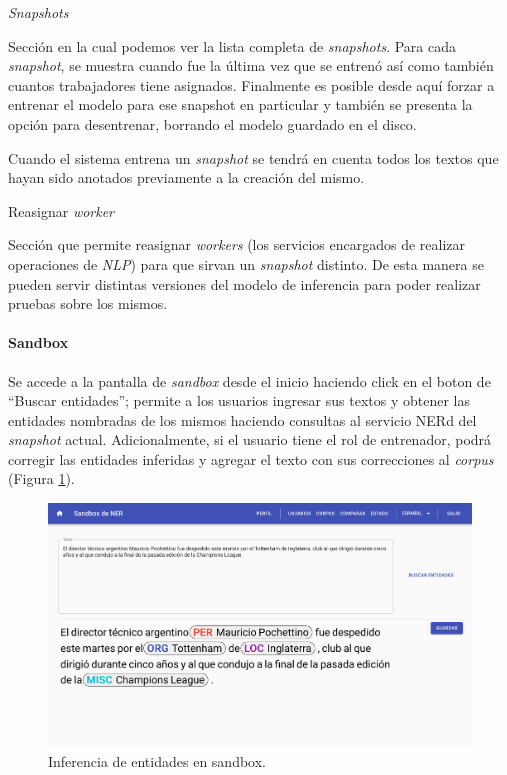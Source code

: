 \documentclass[12pt,a4paper,]{scrartcl}
\let\oldparagraph\paragraph
\renewcommand{\paragraph}[1]{\oldparagraph{#1}\mbox{}}
\begin{document}
\emph{Snapshots}

Sección en la cual podemos ver la lista completa de \emph{snapshots}.
Para cada \emph{snapshot}, se muestra cuando fue la última vez que se entrenó así como también cuantos trabajadores tiene asignados. Finalmente es posible desde aquí forzar a entrenar el modelo para ese snapshot en particular y también se presenta la opción para desentrenar, borrando el modelo guardado en el disco.

Cuando el sistema entrena un \emph{snapshot} se tendrá en cuenta todos los textos que hayan sido anotados previamente a la creación del mismo.

Reasignar \emph{worker}

Sección que permite reasignar \emph{workers} (los servicios encargados de realizar operaciones de \emph{NLP}) para que sirvan un \emph{snapshot} distinto. De esta manera se pueden servir distintas versiones del modelo de inferencia para poder realizar pruebas sobre los mismos.

\hypertarget{sandbox}{%
\paragraph{Sandbox}\label{sandbox}}

Se accede a la pantalla de \emph{sandbox} desde el inicio haciendo click en el boton de \enquote{Buscar entidades}; permite a los usuarios ingresar sus textos y obtener las entidades nombradas de los mismos haciendo consultas al servicio NERd del \emph{snapshot} actual.
Adicionalmente, si el usuario tiene el rol de entrenador, podrá corregir las entidades inferidas y agregar el texto con sus correcciones al \emph{corpus} (Figura \ref{fig:logic-sandbox}).

\begin{figure}[H]

{\centering \includegraphics{assets/logic/sandbox.pdf} 

}

\caption{Inferencia de entidades en sandbox.}\label{fig:logic-sandbox}
\end{figure}
\end{document}
